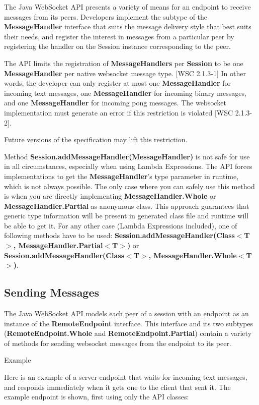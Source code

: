 The Java WebSocket API presents a variety of means for an endpoint to receive messages from its peers. Developers implement the subtype of the \textbf{MessageHandler} interface that suits the message delivery style that best suits their needs, and register the interest in messages from a particular peer by registering the handler on the Session instance corresponding to the peer.

The API limits the registration of \textbf{MessageHandlers} per \textbf{Session} to be one \textbf{MessageHandler} per native websocket message type. [WSC 2.1.3-1] In other words, the developer can only register at most one \textbf{MessageHandler} for incoming text messages, one \textbf{MessageHandler} for incoming binary messages, and one \textbf{MessageHandler} for incoming pong messages. The websocket implementation must generate an error if this restriction is violated [WSC 2.1.3-2].

Future versions of the specification may lift this restriction.

Method \textbf{Session.addMessageHandler(MessageHandler)} is not safe for use in all circumstances, especially when using Lambda Expressions. The API forces implementations to get the \textbf{MessageHandler}'s type parameter in runtime, which is not always possible.  The only case where you can safely use this method is when you are directly implementing \textbf{MessageHandler.Whole} or \textbf{MessageHandler.Partial} as anonymous class. This approach guarantees that generic type information will be present in generated class file and runtime will be able to get it. For any other case (Lambda Expressions included), one of following methods have to be used: \textbf{Session.addMessageHandler(Class$<$T$>$,  MessageHandler.Partial$<$T$>$)} or \textbf{Session.addMessageHandler(Class$<$T$>$,  MessageHandler.Whole$<$T$>$)}.

\subsection{Sending Messages}

The Java WebSocket API models each peer of a session with an endpoint as an instance of the \textbf{RemoteEndpoint} interface. This interface and its two subtypes (\textbf{RemoteEndpoint.Whole} and \textbf{RemoteEndpoint.Partial}) contain a variety of methods for sending websocket messages from the endpoint to its peer.

Example

Here is an example of a server endpoint that waits for incoming text messages, and responds immediately when it gets one to the client that sent it. The example endpoint is shown, first using only the API classes:

